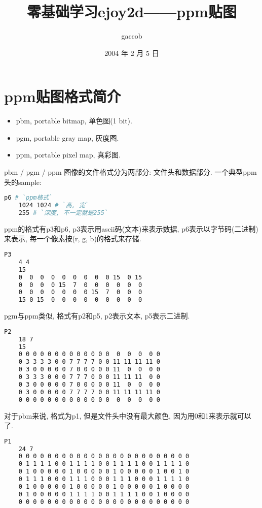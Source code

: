 

\title {\ZHH \huge 零基础学习ejoy2d——ppm贴图}
\author {\small gaccob}
\date {\small 2004 年 2 月 5 日}
\maketitle

\section {\ZHH ppm贴图格式简介} {
    \begin {itemize}
    \item {pbm, portable bitmap, 单色图(1 bit). }
    \item {pgm, portable gray map, 灰度图. }
    \item {ppm, portable pixel map, 真彩图. }
    \end {itemize}\par

    {pbm / pgm / ppm 图像的文件格式分为两部分: 文件头和数据部分. 一个典型ppm头的sample: }\par
    \begin{lstlisting}[language=bash]
    p6 # `ppm格式`
    1024 1024 # `高, 宽`
    255 # `深度, 不一定就是255`
    \end{lstlisting}

    {ppm的格式有p3和p6, p3表示用ascii码(文本)来表示数据, p6表示以字节码(二进制)来表示, 每一个像素按(r, g, b)的格式来存储. }\par
    \begin{lstlisting}[language=bash]
    P3
    4 4
    15
    0  0  0  0  0  0  0  0  0 15  0 15
    0  0  0  0 15  7  0  0  0  0  0  0
    0  0  0  0  0  0  0 15  7  0  0  0
    15 0 15  0  0  0  0  0  0  0  0  0
    \end{lstlisting}

    {pgm与ppm类似, 格式有p2和p5, p2表示文本, p5表示二进制.}\par
    \begin{lstlisting}[language=bash]
    P2
    18 7
    15
    0 0 0 0 0 0 0 0 0 0 0 0 0  0  0  0  0 0
    0 3 3 3 3 0 0 7 7 7 7 0 0 11 11 11 11 0
    0 3 0 0 0 0 0 7 0 0 0 0 0 11  0  0  0 0
    0 3 3 3 0 0 0 7 7 7 0 0 0 11 11 11  0 0
    0 3 0 0 0 0 0 7 0 0 0 0 0 11  0  0  0 0
    0 3 0 0 0 0 0 7 7 7 7 0 0 11 11 11 11 0
    0 0 0 0 0 0 0 0 0 0 0 0 0  0  0  0  0 0
    \end{lstlisting}

    {对于pbm来说, 格式为p1, 但是文件头中没有最大颜色, 因为用0和1来表示就可以了.}\par
    \begin{lstlisting}[language=bash]
    P1
    24 7
    0 0 0 0 0 0 0 0 0 0 0 0 0 0 0 0 0 0 0 0 0 0 0 0
    0 1 1 1 1 0 0 1 1 1 1 0 0 1 1 1 1 0 0 1 1 1 1 0
    0 1 0 0 0 0 0 1 0 0 0 0 0 1 0 0 0 0 0 1 0 0 1 0
    0 1 1 1 0 0 0 1 1 1 0 0 0 1 1 1 0 0 0 1 1 1 1 0
    0 1 0 0 0 0 0 1 0 0 0 0 0 1 0 0 0 0 0 1 0 0 0 0
    0 1 0 0 0 0 0 1 1 1 1 0 0 1 1 1 1 0 0 1 0 0 0 0
    0 0 0 0 0 0 0 0 0 0 0 0 0 0 0 0 0 0 0 0 0 0 0 0
    \end{lstlisting}

}
